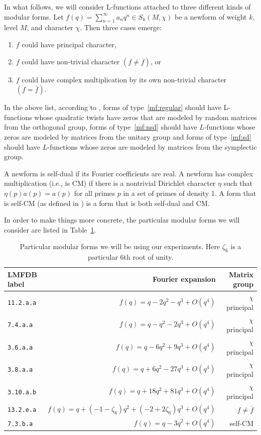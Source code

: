 \documentclass[11pt]{amsart}
\begin{document}
In what follows, we will consider L-functions attached to three different kinds of modular forms.  Let $f(q) = \sum_{n=1}^\infty a_nq^n \in S_k(M, \chi)$ be a newform of weight $k$, level $M$, and character $\chi$. Then three cases emerge:  \begin{enumerate}
\item\label{mf:regular} $f$ could have principal character, 
\item\label{mf:nsd} $f$ could have non-trivial character $(f\neq \overline{f})$, or
\item\label{mf:sd} $f$ could have complex multiplication by its own non-trivial character $(f=\overline{f})$.  
\end{enumerate}
In the above list, according to \cite{bm}, forms of type~\ref{mf:regular} should have L-functions whose quadratic twists have zeros that are modeled by random matrices from the orthogonal group, forms of type~\ref{mf:nsd} should have $L$-functions whose zeros are modeled by matrices from the unitary group and forms of type~\ref{mf:sd} should have $L$-functions whose zeros are modeled by matrices from the symplectic group.  

A newform is self-dual if its Fourier coefficients are real. A newform has complex multiplication (i.e., is CM) if there is a nontrivial Dirichlet character $\eta$ such that $\eta(p)a(p) = a (p)$ for all primes $p$ in a set of primes of density 1.  A form that is self-CM (as defined in \cite{bm}) is a form that is both self-dual and CM.


In order to make things more concrete, the particular modular forms we will consider are listed in Table~\ref{tbl:mfs}.

\begin{table}\small
\begin{tabular}{l|rr}
LMFDB label & Fourier expansion & Matrix group\\\hline\hline
\texttt{11.2.a.a} & $f(q)=  q - 2q^{2} - q^{3} + O(q^{4})$ & $\chi$ principal\\
\texttt{7.4.a.a} & $f(q)=q - q^{2} - 2q^{3} + O(q^{4})$ & $\chi$ principal\\
\texttt{3.6.a.a} & $f(q)=q - 6q^{2} + 9q^{3} + O(q^{4})$ & $\chi$ principal\\
\texttt{3.8.a.a} & $f(q) = q + 6q^{2} - 27q^{3} + O(q^{4})$ & $\chi$ principal\\
\texttt{3.10.a.b} & $f(q) = q + 18 q^{2} + 81 q^{3} + O(q^{4}) $ & $\chi$ principal \\\hline\hline
\texttt{13.2.e.a} & $f(q)= q + ( -1 - \zeta_{6} ) q^{2} + ( -2 + 2 \zeta_{6} ) q^{3} + O(q^{4})$ & $f\neq \overline{f}$\\\hline\hline
\texttt{7.3.b.a} & $f(q)= q - 3q^{2} + O(q^{4})$ & self-CM\\\hline\hline
\end{tabular}
\caption{Particular modular forms we will be using our experiments.  Here $\zeta_6$ is a particular $6$th root of unity.}\label{tbl:mfs}
\end{table}
\end{document}
